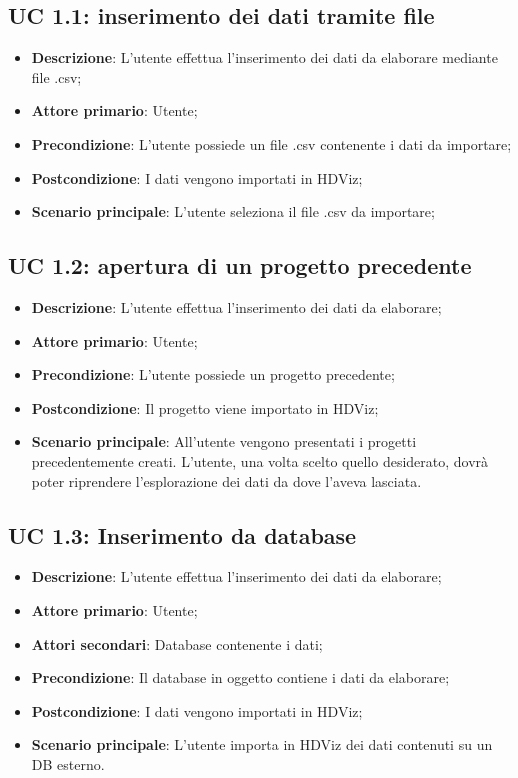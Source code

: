 \subsection{UC 1.1: inserimento dei dati tramite file}
\begin{itemize}
    \item{\textbf{Descrizione}}: L'utente effettua l'inserimento dei dati da elaborare mediante file .csv;
    \item{\textbf{Attore primario}}: Utente;
    \item{\textbf{Precondizione}}: L'utente possiede un file .csv contenente i dati da importare;
    \item{\textbf{Postcondizione}}: I dati vengono importati in HDViz;
    \item{\textbf{Scenario principale}}: L'utente seleziona il file .csv da importare;
\end{itemize}

\subsection{UC 1.2: apertura di un progetto precedente}
\begin{itemize}
    \item{\textbf{Descrizione}}: L'utente effettua l'inserimento dei dati da elaborare;
    \item{\textbf{Attore primario}}: Utente;
    \item{\textbf{Precondizione}}: L'utente possiede un progetto precedente;
    \item{\textbf{Postcondizione}}: Il progetto viene importato in HDViz;
    \item{\textbf{Scenario principale}}: All'utente vengono presentati i progetti precedentemente creati. L'utente, una volta scelto quello desiderato, dovrà poter riprendere l'esplorazione dei dati da dove l'aveva lasciata.
\end{itemize}

\subsection{UC 1.3: Inserimento da database}
\begin{itemize}
    \item{\textbf{Descrizione}}: L'utente effettua l'inserimento dei dati da elaborare;
    \item{\textbf{Attore primario}}: Utente;
    \item{\textbf{Attori secondari}}: Database contenente i dati;
    \item{\textbf{Precondizione}}: Il database in oggetto contiene i dati da elaborare;
    \item{\textbf{Postcondizione}}: I dati vengono importati in HDViz;
    \item{\textbf{Scenario principale}}: L'utente importa in HDViz dei dati contenuti su un DB esterno.
\end{itemize}

